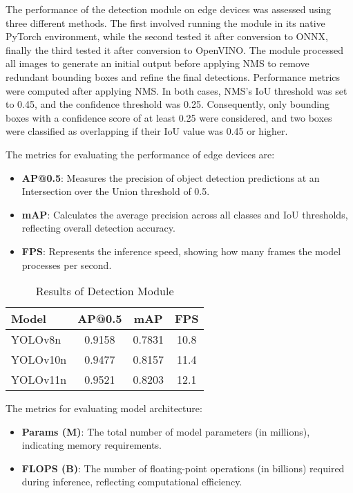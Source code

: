 The performance of the detection module on edge devices was assessed using three different methods. The first involved running the module in its native PyTorch environment, while the second tested it after conversion to ONNX, finally the third tested it after conversion to OpenVINO. The module processed all images to generate an initial output before applying NMS to remove redundant bounding boxes and refine the final detections. Performance metrics were computed after applying NMS. In both cases, NMS's IoU threshold was set to 0.45, and the confidence threshold was 0.25. Consequently, only bounding boxes with a confidence score of at least 0.25 were considered, and two boxes were classified as overlapping if their IoU value was 0.45 or higher.

The metrics for evaluating the performance of edge devices are:

\begin{itemize}
    \item \textbf{AP@0.5}: Measures the precision of object detection predictions at an Intersection over the Union threshold of 0.5.
    \item \textbf{mAP}: Calculates the average precision across all classes and IoU thresholds, reflecting overall detection accuracy.
    \item \textbf{FPS}: Represents the inference speed, showing how many frames the model processes per second.
\end{itemize}

\begin{table}[h]
\centering
\caption{Results of Detection Module}
\label{tab:detection_results}
\begin{tabular}{|l|c|c|c|}
\hline
\textbf{Model} & \textbf{AP@0.5} & \textbf{mAP} & \textbf{FPS} \\
\hline
YOLOv8n & 0.9158 & 0.7831 & 10.8 \\
\hline
YOLOv10n & 0.9477 & 0.8157 & 11.4 \\
\hline
YOLOv11n & 0.9521 & 0.8203 & 12.1 \\
\hline
\end{tabular}
\end{table}

The metrics for evaluating model architecture:

\begin{itemize}
    \item \textbf{Params (M)}: The total number of model parameters (in millions), indicating memory requirements.
    \item \textbf{FLOPS (B)}: The number of floating-point operations (in billions) required during inference, reflecting computational efficiency.
\end{itemize}

